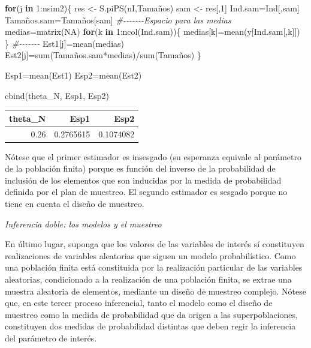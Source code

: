 \documentclass[
  12pt,
]{book}
\newenvironment{Shaded}{\begin{snugshade}}{\end{snugshade}}
\newcommand{\CommentTok}[1]{\textcolor[rgb]{0.56,0.35,0.01}{\textit{#1}}}
\newcommand{\ConstantTok}[1]{\textcolor[rgb]{0.00,0.00,0.00}{#1}}
\newcommand{\ControlFlowTok}[1]{\textcolor[rgb]{0.13,0.29,0.53}{\textbf{#1}}}
\newcommand{\DecValTok}[1]{\textcolor[rgb]{0.00,0.00,0.81}{#1}}
\newcommand{\FunctionTok}[1]{\textcolor[rgb]{0.00,0.00,0.00}{#1}}
\newcommand{\NormalTok}[1]{#1}
\newcommand{\OtherTok}[1]{\textcolor[rgb]{0.56,0.35,0.01}{#1}}
\newcommand{\SpecialCharTok}[1]{\textcolor[rgb]{0.00,0.00,0.00}{#1}}
\begin{document}
\begin{Shaded}
\begin{Highlighting}[]
\ControlFlowTok{for}\NormalTok{(j }\ControlFlowTok{in} \DecValTok{1}\SpecialCharTok{:}\NormalTok{nsim2)\{}
\NormalTok{res }\OtherTok{\textless{}{-}} \FunctionTok{S.piPS}\NormalTok{(nI,Tamaños)}
\NormalTok{sam }\OtherTok{\textless{}{-}}\NormalTok{ res[,}\DecValTok{1}\NormalTok{] }
\NormalTok{Ind.sam}\OtherTok{=}\NormalTok{Ind[,sam]}
\NormalTok{Tamaños.sam}\OtherTok{=}\NormalTok{Tamaños[sam]}
\CommentTok{\#{-}{-}{-}{-}{-}{-}{-}Espacio para las medias}
\NormalTok{medias}\OtherTok{=}\FunctionTok{matrix}\NormalTok{(}\ConstantTok{NA}\NormalTok{)}
\ControlFlowTok{for}\NormalTok{(k }\ControlFlowTok{in} \DecValTok{1}\SpecialCharTok{:}\FunctionTok{ncol}\NormalTok{(Ind.sam))\{}
\NormalTok{medias[k]}\OtherTok{=}\FunctionTok{mean}\NormalTok{(y[Ind.sam[,k]])}
\NormalTok{\}}
\CommentTok{\#{-}{-}{-}{-}{-}{-}{-}}
\NormalTok{Est1[j]}\OtherTok{=}\FunctionTok{mean}\NormalTok{(medias)}
\NormalTok{Est2[j]}\OtherTok{=}\FunctionTok{sum}\NormalTok{(Tamaños.sam}\SpecialCharTok{*}\NormalTok{medias)}\SpecialCharTok{/}\FunctionTok{sum}\NormalTok{(Tamaños)}
\NormalTok{\}}

\NormalTok{Esp1}\OtherTok{=}\FunctionTok{mean}\NormalTok{(Est1)}
\NormalTok{Esp2}\OtherTok{=}\FunctionTok{mean}\NormalTok{(Est2)}

\FunctionTok{cbind}\NormalTok{(theta\_N, Esp1, Esp2)}
\end{Highlighting}
\end{Shaded}

\begin{tabular}{r|r|r}
\hline
theta\_N & Esp1 & Esp2\\
\hline
0.26 & 0.2765615 & 0.1074082\\
\hline
\end{tabular}

Nótese que el primer estimador es insesgado (su esperanza equivale al parámetro de la población finita) porque es función del inverso de la probabilidad de inclusión de los elementos que son inducidas por la medida de probabilidad definida por el plan de muestreo. El segundo estimador es sesgado porque no tiene en cuenta el diseño de muestreo.

\emph{Inferencia doble: los modelos y el muestreo}

En último lugar, suponga que los valores de las variables de interés sí constituyen realizaciones de variables aleatorias que siguen un modelo probabilístico. Como una población finita está constituida por la realización particular de las variables aleatorias, condicionado a la realización de una población finita, se extrae una muestra aleatoria de elementos, mediante un diseño de muestreo complejo. Nótese que, en este tercer proceso inferencial, tanto el modelo como el diseño de muestreo como la medida de probabilidad que da origen a las superpoblaciones, constituyen dos medidas de probabilidad distintas que deben regir la inferencia del parámetro de interés.
\end{document}
